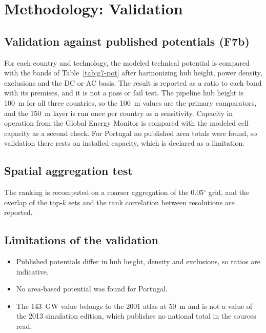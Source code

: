 \section{Methodology: Validation}
\label{sec:g7-method}

\subsection{Validation against published potentials (F7b)}
For each country and technology, the modeled technical potential is compared with the bands of Table~\ref{tab:g7-pot} after harmonizing hub height, power density, exclusions and the DC or AC basis. The result is reported as a ratio to each band with its premises, and it is not a pass or fail test. The pipeline hub height is 100~m for all three countries, so the 100~m values are the primary comparators, and the 150~m layer is run once per country as a sensitivity. Capacity in operation from the Global Energy Monitor is compared with the modeled cell capacity as a second check. %
For Portugal no published area totals were found, so validation there rests on installed capacity, which is declared as a limitation.

\subsection{Spatial aggregation test}
The ranking is recomputed on a coarser aggregation of the 0.05$^{\circ}$ grid, and the overlap of the top-$k$ sets and the rank correlation between resolutions are reported. %

\subsection{Limitations of the validation}
\begin{itemize}
\item Published potentials differ in hub height, density and exclusions, so ratios are indicative.
\item No area-based potential was found for Portugal.
\item The 143~GW value belongs to the 2001 atlas at 50~m and is not a value of the 2013 simulation edition, which publishes no national total in the sources read.
\end{itemize}
